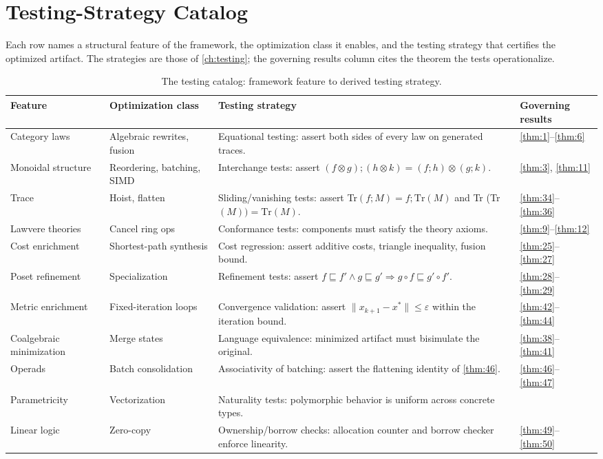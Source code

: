 \section{Testing-Strategy Catalog}
Each row names a structural feature of the framework, the optimization class it enables, and the testing strategy that certifies the optimized artifact. The strategies are those of \autoref{ch:testing}; the governing results column cites the theorem the tests operationalize.

\begin{table}[!htbp]
\centering
\caption{The testing catalog: framework feature to derived testing strategy.}
\label{tab:test-catalog}
\small
\begin{tabular}{@{}p{3.6cm}p{4.4cm}p{3.6cm}l@{}}
\toprule
Feature & Optimization class & Testing strategy & Governing results\\
\midrule
Category laws & Algebraic rewrites, fusion & Equational testing: assert both sides of every law on generated traces. & \ref{thm:1}--\ref{thm:6}\\
Monoidal structure & Reordering, batching, SIMD & Interchange tests: assert $(f\otimes g);(h\otimes k) = (f;h)\otimes (g;k)$. & \ref{thm:3}, \ref{thm:11}\\
Trace & Hoist, flatten & Sliding/vanishing tests: assert Tr$(f;M) = f;\mathrm{Tr} (M)$ and Tr (Tr$(M)) = \mathrm{Tr} (M)$. & \ref{thm:34}--\ref{thm:36}\\
Lawvere theories & Cancel ring ops & Conformance tests: components must satisfy the theory axioms. & \ref{thm:9}--\ref{thm:12}\\
Cost enrichment & Shortest-path synthesis & Cost regression: assert additive costs, triangle inequality, fusion bound. & \ref{thm:25}--\ref{thm:27}\\
Poset refinement & Specialization & Refinement tests: assert $f \sqsubseteq f' \wedge g \sqsubseteq g' \Rightarrow g\circ f \sqsubseteq g'\circ f'$. & \ref{thm:28}--\ref{thm:29}\\
Metric enrichment & Fixed-iteration loops & Convergence validation: assert $\lVert x_{k+1}-x^*\rVert \le \varepsilon$ within the iteration bound. & \ref{thm:42}--\ref{thm:44}\\
Coalgebraic minimization & Merge states & Language equivalence: minimized artifact must bisimulate the original. & \ref{thm:38}--\ref{thm:41}\\
Operads & Batch consolidation & Associativity of batching: assert the flattening identity of \ref{thm:46}. & \ref{thm:46}--\ref{thm:47}\\
Parametricity & Vectorization & Naturality tests: polymorphic behavior is uniform across concrete types. & \cite{wadler}\\
Linear logic & Zero-copy & Ownership/borrow checks: allocation counter and borrow checker enforce linearity. & \ref{thm:49}--\ref{thm:50}\\
\bottomrule
\end{tabular}
\end{table}

